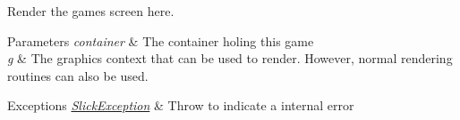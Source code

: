 Render the game\textquotesingle{}s screen here.


\begin{DoxyParams}{Parameters}
{\em container} & The container holing this game \\
\hline
{\em g} & The graphics context that can be used to render. However, normal rendering routines can also be used. \\
\hline
\end{DoxyParams}

\begin{DoxyExceptions}{Exceptions}
{\em \mbox{\hyperlink{classorg_1_1newdawn_1_1slick_1_1_slick_exception}{Slick\+Exception}}} & Throw to indicate a internal error \\
\hline
\end{DoxyExceptions}


